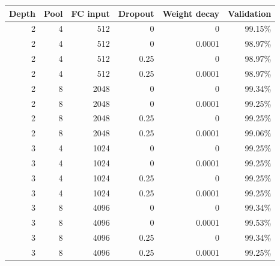 \begin{center}\begin{tabular}{rrrrrr}
\toprule
Depth & Pool & FC input & Dropout & Weight decay & Validation \\\midrule
2 & 4 & 512 & 0 & 0 & 99.15\% \\
2 & 4 & 512 & 0 & 0.0001 & 98.97\% \\
2 & 4 & 512 & 0.25 & 0 & 98.97\% \\
2 & 4 & 512 & 0.25 & 0.0001 & 98.97\% \\
2 & 8 & 2048 & 0 & 0 & 99.34\% \\
2 & 8 & 2048 & 0 & 0.0001 & 99.25\% \\
2 & 8 & 2048 & 0.25 & 0 & 99.25\% \\
2 & 8 & 2048 & 0.25 & 0.0001 & 99.06\% \\
3 & 4 & 1024 & 0 & 0 & 99.25\% \\
3 & 4 & 1024 & 0 & 0.0001 & 99.25\% \\
3 & 4 & 1024 & 0.25 & 0 & 99.25\% \\
3 & 4 & 1024 & 0.25 & 0.0001 & 99.25\% \\
3 & 8 & 4096 & 0 & 0 & 99.34\% \\
3 & 8 & 4096 & 0 & 0.0001 & 99.53\% \\
3 & 8 & 4096 & 0.25 & 0 & 99.34\% \\
3 & 8 & 4096 & 0.25 & 0.0001 & 99.25\% \\
\bottomrule\end{tabular}\end{center}
